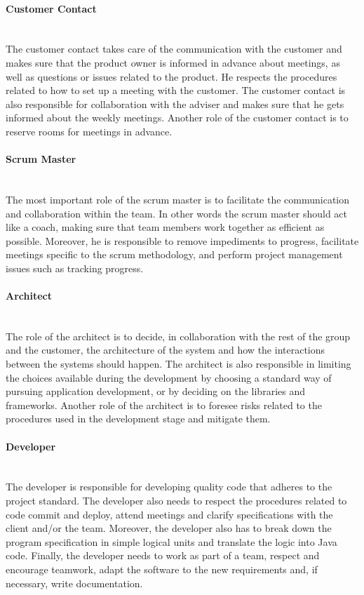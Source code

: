 \documentclass[../document.tex]{subfiles}
\begin{document}
\paragraph{Customer Contact} \ \\
The customer contact takes care of the communication with the customer and makes sure that the product owner is informed in advance about meetings, as well as questions or issues related to the product. He respects the procedures related to how to set up a meeting with the customer. The customer contact is also responsible for collaboration with the adviser and makes sure that he gets informed about the weekly meetings. Another role of the customer contact is to reserve rooms for meetings in advance.

\paragraph{Scrum Master} \ \\
The most important role of the scrum master is to facilitate the communication and collaboration within the team. In other words the scrum master should act like a coach, making sure that team members work together as efficient as possible. Moreover, he is responsible to remove impediments to progress, facilitate meetings specific to the scrum methodology, and perform project management issues such as tracking progress. 

\paragraph{Architect} \ \\
The role of the architect is to decide, in collaboration with the rest of the group and the customer, the architecture of the system and how the interactions between the systems should happen. The architect is also responsible in limiting the choices available during the development by choosing a standard way of pursuing application development, or by deciding on the libraries and frameworks. Another role of the architect is to foresee risks related to the procedures used in the development stage and mitigate them. 

\paragraph{Developer} \ \\
The developer is responsible for developing quality code that adheres to the project standard. The developer also needs to respect the procedures related to code commit and deploy, attend meetings and clarify specifications with the client and/or the team. Moreover, the developer also has to break down the program specification in simple logical units and translate the logic into \gls{Java} code. Finally, the developer needs to work as part of a team, respect and encourage teamwork, adapt the software to the new requirements and, if necessary, write documentation.
\end{document}
